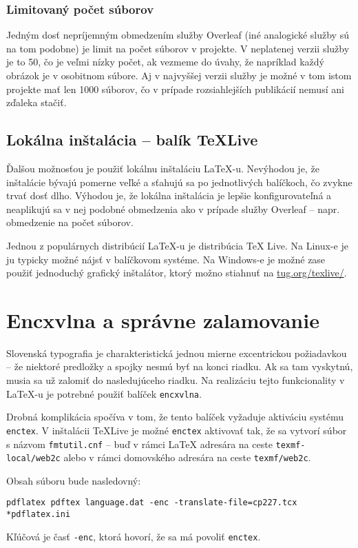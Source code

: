 \subsubsection{Limitovaný počet súborov}

Jedným dosť nepríjemným obmedzením služby Overleaf (iné analogické služby sú na tom podobne) je limit na počet súborov v projekte. V neplatenej verzii služby je to 50, čo je veľmi nízky počet, ak vezmeme do úvahy, že napríklad každý obrázok je v osobitnom súbore. Aj v najvyššej verzii služby je možné v tom istom projekte mať len 1000 súborov, čo v prípade rozsiahlejších publikácií nemusí ani zďaleka stačiť.

\subsection{Lokálna inštalácia -- balík TeXLive}

Ďalšou možnosťou je použiť lokálnu inštaláciu LaTeX-u. Nevýhodou je, že inštalácie bývajú pomerne veľké a sťahujú sa po jednotlivých balíčkoch, čo zvykne trvať dosť dlho. Výhodou je, že lokálna inštalácia je lepšie konfigurovateľná a neaplikujú sa v nej podobné obmedzenia ako v prípade služby Overleaf -- napr. obmedzenie na počet súborov.

Jednou z populárnych distribúcií LaTeX-u je distribúcia TeX Live. Na Linux-e je ju typicky možné nájsť v balíčkovom systéme. Na Windows-e je možné zase použiť jednoduchý grafický inštalátor, ktorý možno stiahnuť na \href{https://www.tug.org/texlive/}{tug.org/texlive/}.

\section{Encxvlna a správne zalamovanie}

Slovenská typografia je charakteristická jednou mierne excentrickou požiadavkou -- že niektoré predložky a spojky nesmú byť na konci riadku. Ak sa tam vyskytnú, musia sa už zalomiť do nasledujúceho riadku. Na realizáciu tejto funkcionality v LaTeX-u je potrebné použiť balíček \texttt{encxvlna}.

Drobná komplikácia spočíva v tom, že tento balíček vyžaduje aktiváciu systému \texttt{enctex}. V inštalácii TeXLive je možné \texttt{enctex} aktivovať tak, že sa vytvorí súbor s názvom \texttt{fmtutil.cnf} -- buď v rámci LaTeX adresára na ceste \texttt{texmf-local/web2c} alebo v rámci domovského adresára na ceste \texttt{texmf/web2c}.

Obsah súboru bude nasledovný:
\begin{Verbatim}
pdflatex pdftex language.dat -enc -translate-file=cp227.tcx *pdflatex.ini
\end{Verbatim}
Kľúčová je časť \texttt{-enc}, ktorá hovorí, že sa má povoliť \texttt{enctex}.

